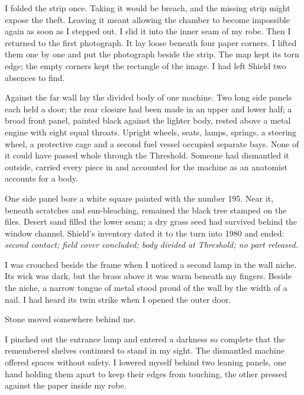 I folded the strip once. Taking it would be breach, and the missing strip might expose the theft. Leaving it meant allowing the chamber to become impossible again as soon as I stepped out. I slid it into the inner seam of my robe. Then I returned to the first photograph. It lay loose beneath four paper corners. I lifted them one by one and put the photograph beside the strip. The map kept its torn edge; the empty corners kept the rectangle of the image. I had left Shield two absences to find.\par

Against the far wall lay the divided body of one machine. Two long side panels each held a door; the rear closure had been made in an upper and lower half; a broad front panel, painted black against the lighter body, rested above a metal engine with eight equal throats. Upright wheels, seats, lamps, springs, a steering wheel, a protective cage and a second fuel vessel occupied separate bays. None of it could have passed whole through the Threshold. Someone had dismantled it outside, carried every piece in and accounted for the machine as an anatomist accounts for a body.\par

One side panel bore a white square painted with the number 195. Near it, beneath scratches and sun-bleaching, remained the black tree stamped on the files. Desert sand filled the lower seam; a dry grass seed had survived behind the window channel. Shield's inventory dated it to the turn into 1980 and ended: \textit{second contact; field cover concluded; body divided at Threshold; no part released.}\par

I was crouched beside the frame when I noticed a second lamp in the wall niche. Its wick was dark, but the brass above it was warm beneath my fingers. Beside the niche, a narrow tongue of metal stood proud of the wall by the width of a nail. I had heard its twin strike when I opened the outer door.\par

Stone moved somewhere behind me.\par

I pinched out the entrance lamp and entered a darkness so complete that the remembered shelves continued to stand in my sight. The dismantled machine offered spaces without safety. I lowered myself behind two leaning panels, one hand holding them apart to keep their edges from touching, the other pressed against the paper inside my robe.\par

